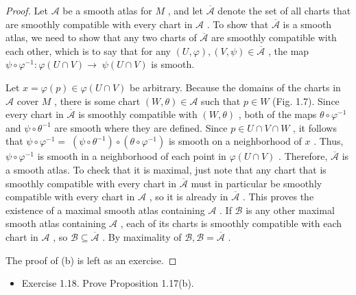 \begin{proof}
\leanok
Let $\mathcal{A}$ be a smooth atlas for $M$ , and let $\overline{\mathcal{A}}$ denote the set of all charts that are smoothly compatible with every chart in $\mathcal{A}$ . To show that $\overline{\mathcal{A}}$ is a smooth atlas, we need to show that any two charts of $\overline{\mathcal{A}}$ are smoothly compatible with each other, which is to say that for any $\left( {U,\varphi }\right) ,\left( {V,\psi }\right)  \in  \overline{\mathcal{A}}$ , the map $\psi  \circ  {\varphi }^{-1} : \varphi \left( {U \cap  V}\right)  \rightarrow \; \psi \left( {U \cap  V}\right)$ is smooth.

Let $x = \varphi \left( p\right)  \in  \varphi \left( {U \cap  V}\right)$ be arbitrary. Because the domains of the charts in $\mathcal{A}$ cover $M$ , there is some chart $\left( {W,\theta }\right)  \in  \mathcal{A}$ such that $p \in  W$ (Fig. 1.7). Since every chart in $\overline{\mathcal{A}}$ is smoothly compatible with $\left( {W,\theta }\right)$ , both of the maps $\theta  \circ  {\varphi }^{-1}$ and $\psi  \circ  {\theta }^{-1}$ are smooth where they are defined. Since $p \in  U \cap  V \cap  W$ , it follows that $\psi  \circ  {\varphi }^{-1} = \; \left( {\psi  \circ  {\theta }^{-1}}\right)  \circ  \left( {\theta  \circ  {\varphi }^{-1}}\right)$ is smooth on a neighborhood of $x$ . Thus, $\psi  \circ  {\varphi }^{-1}$ is smooth in a neighborhood of each point in $\varphi \left( {U \cap  V}\right)$ . Therefore, $\overline{\mathcal{A}}$ is a smooth atlas. To check that it is maximal, just note that any chart that is smoothly compatible with every chart in $\overline{\mathcal{A}}$ must in particular be smoothly compatible with every chart in $\mathcal{A}$ , so it is already in $\overline{\mathcal{A}}$ . This proves the existence of a maximal smooth atlas containing $\mathcal{A}$ . If $\mathcal{B}$ is any other maximal smooth atlas containing $\mathcal{A}$ , each of its charts is smoothly compatible with each chart in $\mathcal{A}$ , so $\mathcal{B} \subseteq  \overline{\mathcal{A}}$ . By maximality of $\mathcal{B},\mathcal{B} = \overline{\mathcal{A}}$ .

The proof of (b) is left as an exercise.
\end{proof}

\begin{exercise}
\label{exer:1-18}
\leanok
{}
\begin{itemize}
\item Exercise 1.18. Prove Proposition 1.17(b).
\end{itemize}
\end{exercise}

